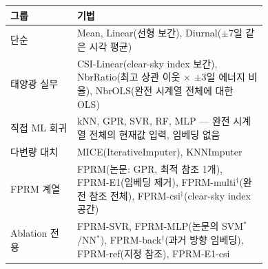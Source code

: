 \begin{tabular}{lp{0.74\linewidth}}
\toprule
그룹 & 기법 \\
\midrule
단순 & Mean, Linear(선형 보간), Diurnal($\pm$7일 같은 시각 평균) \\
태양광 실무 & CSI-Linear(clear-sky index 보간), NbrRatio(최고 상관 이웃 $\times$ $\pm$3일 에너지 비율), NbrOLS(완전 시계열 전체에 대한 OLS) \\
직접 ML 회귀 & kNN, GPR, SVR, RF, MLP --- 완전 시계열 전체의 현재값 입력, 임베딩 없음 \\
다변량 대치 & MICE(IterativeImputer), KNNImputer \\
FPRM 계열 & FPRM(논문: GPR, 최적 참조 1개), FPRM-E1(임베딩 제거), FPRM-multi$^\dagger$(완전 참조 전체), FPRM-csi$^\dagger$(clear-sky index 공간) \\
Ablation 전용 & FPRM-SVR, FPRM-MLP(논문의 SVM$^*$/NN$^*$), FPRM-back$^\dagger$(과거 방향 임베딩), FPRM-ref(지정 참조), FPRM-E1-csi \\
\bottomrule
\end{tabular}
